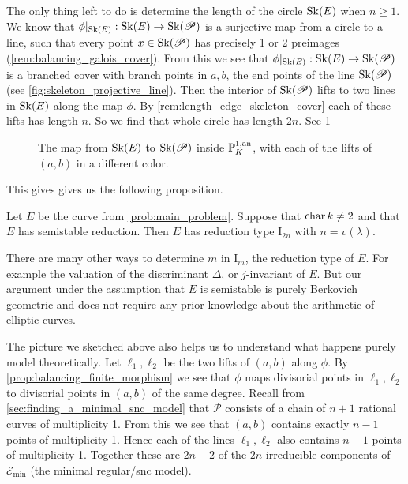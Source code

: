 The only thing left to do is determine the length of the circle $\operatorname{Sk}(E)$ when $n \ge 1$.
We know that $\phi|_{\sk(E)}:\sk (E) \to \sk(\mathscr P)$ is a surjective map from a circle to a line, such that every point $x \in \operatorname{Sk}(\mathscr P)$ has precisely 1 or 2 preimages (\cref{rem:balancing_galois_cover}). 
From this we see that $\phi|_{\sk(E)}: \sk(E) \to \sk(\mathscr P)$ is a branched cover with branch points in $a, b$, the end points of the line $\operatorname{Sk}(\mathscr P)$ (see \cref{fig:skeleton_projective_line}).
Then the interior of $\operatorname{Sk}(\mathscr P)$ lifts to two lines in $\mathscr  {\operatorname{Sk}}(E)$ along the map $\phi$.
By \cref{rem:length_edge_skeleton_cover} each of these lifts has length $n$. 
So we find that whole circle has length $2n$. 
See \cref{fig:map_circle_line}
\begin{figure}[ht]
    \centering
    \caption{The map from $\operatorname{Sk}(E)$ to $\operatorname{Sk}(\mathscr P)$ inside $\mathbb{P}^{1, \text{an}}_K$, with each of the lifts of $(a, b)$ in a different color.}
    \label{fig:map_circle_line}
\end{figure}
This gives gives us the following proposition.
\begin{proposition}
	Let $E$ be the curve from \cref{prob:main_problem}. 
	Suppose that $\operatorname{char} k \ne 2$ and that $E$ has semistable reduction. 
	Then $E$ has reduction type $\mathrm I_{2n}$ with $n = v(\lambda)$. 
\end{proposition}

\begin{remark}
	There are many other ways to determine $m$ in $\mathrm I_m$, the reduction type of  $E$. 
	For example the valuation of the  discriminant $\Delta$,  or $j$-invariant of $E$. 
	But our argument under the assumption that $E$ is semistable is purely Berkovich geometric and does not require any prior knowledge about the arithmetic of elliptic curves.
\end{remark}

The picture we sketched above also helps us to understand what happens purely model theoretically. 
Let $\ell_1, \ell_2$ be the two lifts of $(a, b)$ along $\phi$. 
By \cref{prop:balancing_finite_morphism} we see that $\phi$ maps divisorial points in $\ell_1, \ell_2$ to divisorial points in $(a, b)$ of the same degree. 
Recall from \cref{sec:finding_a_minimal_snc_model} that $\mathscr P$ consists of a chain of $n+1$ rational curves of multiplicity 1. 
From this we see that $(a, b)$ contains exactly $n -1$ points of multiplicity 1. 
Hence each of the lines $\ell_1, \ell_2$ also contains $n-1$ points of multiplicity 1.
Together these are $2n - 2$ of the  $2n$ irreducible components of $\mathscr E_\text{min} $ (the minimal regular/snc model). 


